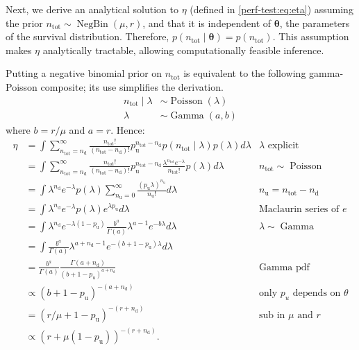 \documentclass[referee,useAMS,usenatbib]{biom}
\def\dist{\sim}
\DeclareMathOperator{\Poi}{Poisson}
\DeclareMathOperator{\NBr}{NegBin}
\newcommand{\NBc}{\NBr}
\DeclareMathOperator{\GamDist}{Gamma}
\renewcommand{\vec}[1]{\bm{#1}}
\newcommand{\ntot}{n_\text{tot}}
\newcommand{\ndet}{n_\text{d}}
\newcommand{\nnodet}{n_\text{u}}
\newcommand{\pnodet}{p_\text{u}}
\begin{document}
Next, we derive an analytical solution to $\eta$ (defined in \cref{perf-test:eq:eta}) assuming the prior $\ntot \dist \NBc(\mu, r)$, and that it is independent of $\vec{\theta}$, the parameters of the survival distribution.
Therefore, $p(\ntot \mid \vec{\theta}) = p(\ntot)$.
This assumption makes $\eta$ analytically tractable, allowing computationally feasible inference.

Putting a negative binomial prior on $\ntot$ is equivalent to the following gamma-Poisson composite; its use simplifies the derivation.
\begin{align}
\ntot \mid \lambda &\dist \Poi(\lambda) \\
\lambda &\dist \GamDist(a, b)
\end{align}
where $b = r / \mu$ and $a = r$.
Hence:
\begin{align}
\eta
&= \int \sum_{\ntot=\ndet}^\infty \frac{\ntot!}{(\ntot-\ndet)!} \pnodet^{\ntot-\ndet} p(\ntot \mid \lambda) p(\lambda) d\lambda &\text{$\lambda$ explicit}\\
&= \int \sum_{\ntot=\ndet}^\infty \frac{\ntot!}{(\ntot-\ndet)!} \pnodet^{\ntot-\ndet} \frac{\lambda^{\ntot} e^{-\lambda}}{\ntot!} p(\lambda) d\lambda &\ntot \dist \Poi\\
&= \int \lambda^{\ndet} e^{-\lambda} p(\lambda) \sum_{\nnodet=0}^\infty \frac{(\pnodet \lambda)^{\nnodet}}{\nnodet!} d\lambda &\nnodet = \ntot-\ndet\\
&= \int \lambda^{\ndet} e^{-\lambda} p(\lambda) e^{\lambda \pnodet} d\lambda &\text{Maclaurin series of $e$} \\
&= \int \lambda^{\ndet} e^{-\lambda(1 - \pnodet)} \frac{b^a}{\Gamma(a)} \lambda^{a-1} e^{-b\lambda} d\lambda &\lambda \dist \GamDist\\
&= \int \frac{b^a}{\Gamma(a)} \lambda^{a+\ndet-1} e^{-(b+1-\pnodet)\lambda} d\lambda \\
&= \frac{b^a}{\Gamma(a)} \frac{\Gamma(a+\ndet)}{(b+1-\pnodet)^{a+\ndet}} &\text{Gamma pdf}\\
&\propto (b+1-\pnodet)^{-(a+\ndet)} &\text{only $p_u$ depends on $\theta$}\\
&= (r/\mu + 1 - \pnodet)^{-(r+\ndet)} &\text{sub in $\mu$ and $r$}\\
&\propto(r + \mu (1- \pnodet))^{-(r+\ndet)}.
\end{align}
\end{document}
